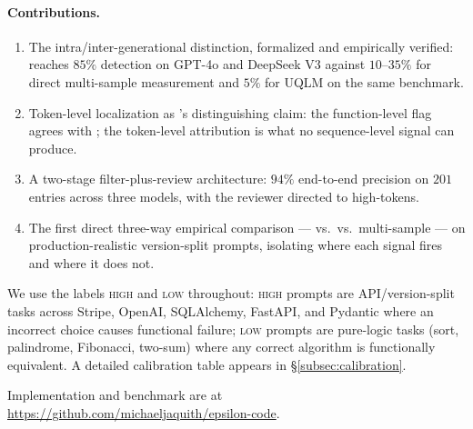\paragraph{Contributions.}
\begin{enumerate}[noitemsep]
    \item The intra/inter-generational distinction, formalized and
    empirically verified: \eps reaches $85\%$ detection on GPT-4o and
    DeepSeek V3 against $10$--$35\%$ for direct multi-sample
    measurement and $5\%$ for UQLM on the same benchmark.
    \item Token-level localization as \eps's distinguishing claim:
    the function-level flag agrees with \papg; the token-level
    attribution is what no sequence-level signal can produce.
    \item A two-stage filter-plus-review architecture: $94\%$
    end-to-end precision on $201$ entries across three models, with
    the reviewer directed to high-\eps tokens.
    \item The first direct three-way empirical comparison --- \eps
    vs.\ \papg vs.\ multi-sample --- on production-realistic
    version-split prompts, isolating where each signal fires and
    where it does not.
\end{enumerate}

We use the labels \textsc{high} and \textsc{low} throughout:
\textsc{high} prompts are API/version-split tasks across Stripe,
OpenAI, SQLAlchemy, FastAPI, and Pydantic where an incorrect choice
causes functional failure; \textsc{low} prompts are pure-logic tasks
(sort, palindrome, Fibonacci, two-sum) where any correct algorithm
is functionally equivalent. A detailed calibration table appears in
\S\ref{subsec:calibration}.

Implementation and benchmark are at
\url{https://github.com/michaeljaquith/epsilon-code}.
